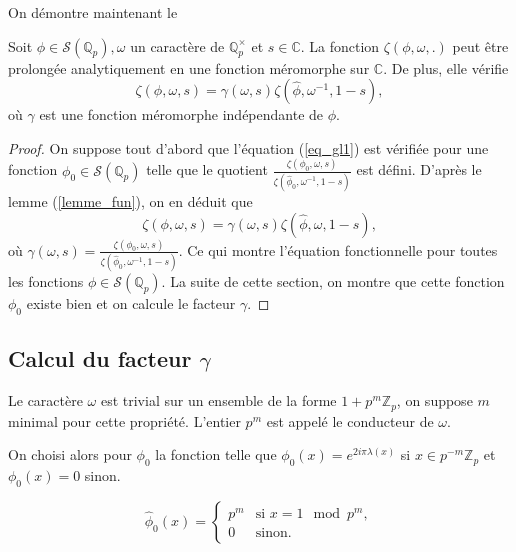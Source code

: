 On démontre maintenant le
\begin{theoreme}
Soit $\phi \in \mathcal{S}(\mathbb{Q}_p), \omega$ un caractère de $\mathbb{Q}_p^\times$ et $s \in \mathbb{C}$. La fonction $\zeta(\phi, \omega, .)$ peut être prolongée analytiquement en une fonction méromorphe sur $\mathbb{C}$. De plus, elle vérifie
\begin{equation}
\label{eq_gl1}
\zeta(\phi,\omega,s)=\gamma(\omega, s)\zeta(\hat{\phi}, \omega^{-1}, 1-s),
\end{equation}
où $\gamma$ est une fonction méromorphe indépendante de $\phi$.
\end{theoreme}

\begin{proof}
On suppose tout d'abord que l'équation (\ref{eq_gl1}) est vérifiée pour une fonction $\phi_0 \in \mathcal{S}(\mathbb{Q}_p)$ telle que le quotient $\frac{\zeta(\phi_0, \omega, s)}{\zeta(\hat{\phi}_0, \omega^{-1}, 1-s)}$ est défini. D'après le lemme (\ref{lemme_fun}), on en déduit que
\begin{equation}
\zeta(\phi, \omega, s) = \gamma(\omega,s)\zeta(\hat{\phi}, \omega, 1-s),
\end{equation}
où $\gamma(\omega,s) = \frac{\zeta(\phi_0, \omega, s)}{\zeta(\hat{\phi}_0, \omega^{-1}, 1-s)}$. Ce qui montre l'équation fonctionnelle pour toutes les fonctions $\phi \in \mathcal{S}(\mathbb{Q}_p)$. La suite de cette section, on montre que cette fonction $\phi_0$ existe bien et on calcule le facteur $\gamma$.
\end{proof}

\subsection{Calcul du facteur $\gamma$}

Le caractère $\omega$ est trivial sur un ensemble de la forme $1+p^m \mathbb{Z}_p$, on suppose $m$ minimal pour cette propriété. L'entier $p^m$ est appelé le conducteur de $\omega$.

On choisi alors pour $\phi_0$ la fonction telle que $\phi_0(x)=e^{2i\pi \lambda(x)}$ si $x \in p^{-m}\mathbb{Z}_p$ et $\phi_0(x)=0$ sinon.

\begin{lemme}
\begin{equation}
\hat{\phi}_0(x) = \left\{
    \begin{array}{ll}
        p^m & \mbox{si } x = 1 \mod p^m, \\
        0 & \mbox{sinon.}
    \end{array}
\right.
\end{equation}
\end{lemme}


